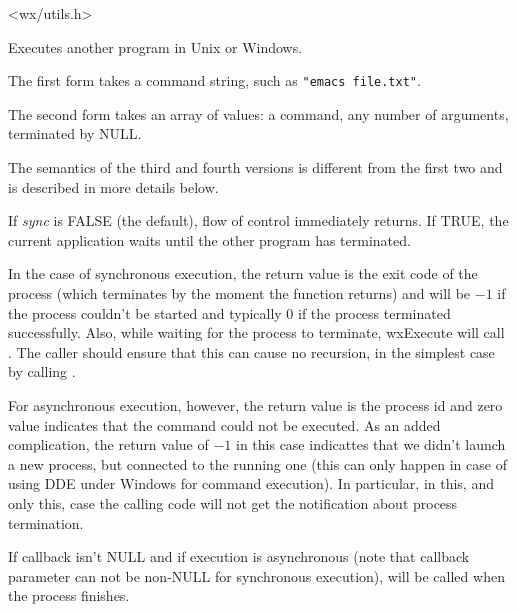
<wx/utils.h>

\label{wxexecute}





Executes another program in Unix or Windows.

The first form takes a command string, such as {\tt "emacs file.txt"}.

The second form takes an array of values: a command, any number of
arguments, terminated by NULL.

The semantics of the third and fourth versions is different from the first two
and is described in more details below.

If {\it sync} is FALSE (the default), flow of control immediately returns.
If TRUE, the current application waits until the other program has terminated.

In the case of synchronous execution, the return value is the exit code of
the process (which terminates by the moment the function returns) and will be
$-1$ if the process couldn't be started and typically 0 if the process
terminated successfully. Also, while waiting for the process to
terminate, wxExecute will call . The caller
should ensure that this can cause no recursion, in the simplest case by
calling .

For asynchronous execution, however, the return value is the process id and
zero value indicates that the command could not be executed. As an added
complication, the return value of $-1$ in this case indicattes that we didn't
launch a new process, but connected to the running one (this can only happen in
case of using DDE under Windows for command execution). In particular, in this,
and only this, case the calling code will not get the notification about
process termination.

If callback isn't NULL and if execution is asynchronous (note that callback
parameter can not be non-NULL for synchronous execution),
 will be called when
the process finishes.

